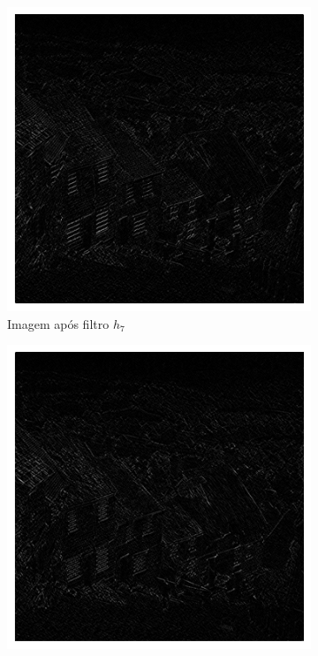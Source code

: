 \documentclass[12pt,a4paper]{report}
\begin{document}
\begin{enumerate}
    \begin{figure}[H]
      \centering
      \begin{subfigure}{0.6\textwidth}
        \includegraphics[width=\linewidth]{imagens/ex10-07.png}
        \caption{Imagem após filtro $h_7$}
        \label{fig:cidade_filtro_h7}
      \end{subfigure}
      \begin{subfigure}{0.6\textwidth}
        \includegraphics[width=\linewidth]{imagens/ex10-08.png}

\end{subfigure}
\end{figure}
\end{enumerate}
\end{document}
